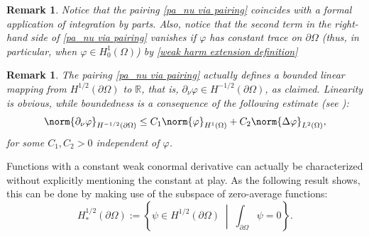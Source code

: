 \documentclass[a4paper,11pt]{article}
\newtheorem{remark}[theorem]{Remark}
\newcommand\setbld[2]{\left\{ #1 \;\middle |\; #2\right\}}
\numberwithin{equation}{section}
\begin{document}
\begin{remark}
Notice that the pairing \eqref{pa_nu via pairing} coincides with a formal application of integration by parts. Also, notice that the second term in the right-hand side of \eqref{pa_nu via pairing} vanishes if $\varphi$ has constant trace on $\partial\Omega$ (thus, in particular, when $\varphi\in H_0^1(\Omega)$) by \eqref{weak harm extension definition}   
\end{remark}

\begin{remark}
The pairing \eqref{pa_nu via pairing} actually defines a bounded linear mapping from $H^{1/2}(\partial\Omega)$ to $\mathbb{R}$, that is, $\partial_\nu \varphi\in H^{-1/2}(\partial\Omega)$, as claimed. Linearity is obvious, while boundedness is a consequence of the following estimate (see \cite[Lemma 4.3]{mclean2000strongly}):
\begin{equation}\label{mclean estimate}
    \norm{\partial_\nu \varphi}_{H^{-1/2}(\partial\Omega)}\le C_1 \norm{\varphi}_{H^1(\Omega)}+C_2\norm{\Delta\varphi}_{L^2(\Omega)},
\end{equation}
for some $C_1,C_2>0$ independent of $\varphi$.
\end{remark}

Functions with a constant weak conormal derivative can actually be characterized without explicitly mentioning the constant at play. As the following result shows, this can be done by making use of the subspace of zero-average functions:  
\begin{equation}\label{zero average test functions}
    H_*^{1/2}(\partial\Omega):=\setbld{\psi\in H^{1/2}(\partial\Omega)}{\int_{\partial\Omega}\psi=0}.
\end{equation}
\end{document}
